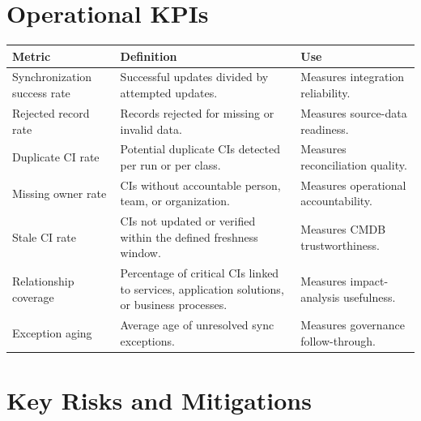 \documentclass[11pt]{article}
\begin{document}
\section{Operational KPIs}

\begin{longtable}{>{\raggedright\arraybackslash}p{\dimexpr 0.31111\dimexpr\linewidth-6\tabcolsep\relax\relax}>{\raggedright\arraybackslash}p{\dimexpr 0.35556\dimexpr\linewidth-6\tabcolsep\relax\relax}>{\raggedright\arraybackslash}p{\dimexpr 0.33333\dimexpr\linewidth-6\tabcolsep\relax\relax}}
\toprule
\rowcolor{LightBlue}\textbf{Metric} & \textbf{Definition} & \textbf{Use} \\
\midrule
Synchronization success rate & Successful updates divided by attempted updates. & Measures integration reliability. \\
Rejected record rate & Records rejected for missing or invalid data. & Measures source-data readiness. \\
Duplicate CI rate & Potential duplicate CIs detected per run or per class. & Measures reconciliation quality. \\
Missing owner rate & CIs without accountable person, team, or organization. & Measures operational accountability. \\
Stale CI rate & CIs not updated or verified within the defined freshness window. & Measures CMDB trustworthiness. \\
Relationship coverage & Percentage of critical CIs linked to services, application solutions, or business processes. & Measures impact-analysis usefulness. \\
Exception aging & Average age of unresolved sync exceptions. & Measures governance follow-through. \\
\bottomrule
\end{longtable}

\section{Key Risks and Mitigations}
\end{document}
